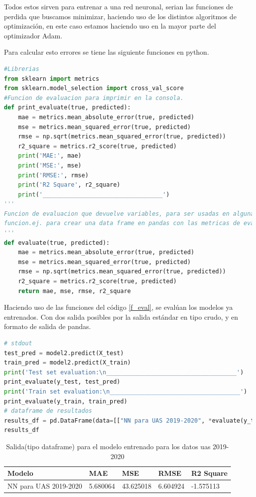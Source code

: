 Todos estos sirven para entrenar a una red neuronal, serian las funciones de
perdida que buscamos minimizar, haciendo uso de los distintos algoritmos de
optimización, en este caso estamos haciendo uso en la mayor parte del
optimizador Adam.

Para calcular esto errores se tiene las siguiente funciones en python. 
\begin{lstlisting}[language=Python, label=f_eval, caption= definicion de
funciones de evaluacion utilizando sklearn como herramienta base]
#Librerias
from sklearn import metrics
from sklearn.model_selection import cross_val_score
#Funcion de evaluacion para imprimir en la consola.
def print_evaluate(true, predicted):  
    mae = metrics.mean_absolute_error(true, predicted)
    mse = metrics.mean_squared_error(true, predicted)
    rmse = np.sqrt(metrics.mean_squared_error(true, predicted))
    r2_square = metrics.r2_score(true, predicted)
    print('MAE:', mae)
    print('MSE:', mse)
    print('RMSE:', rmse)
    print('R2 Square', r2_square)
    print('__________________________________')
'''
Funcion de evaluacion que devuelve variables, para ser usadas en alguna otra
funcion.ej. para crear una data frame en pandas con las metricas de evaluacion. 
'''
def evaluate(true, predicted):
    mae = metrics.mean_absolute_error(true, predicted)
    mse = metrics.mean_squared_error(true, predicted)
    rmse = np.sqrt(metrics.mean_squared_error(true, predicted))
    r2_square = metrics.r2_score(true, predicted)
    return mae, mse, rmse, r2_square
\end{lstlisting}

Haciendo uso de las funciones del código \ref{f_eval}, se evalúan los modelos
ya entrenados. Con dos  salida posibles por la salida estándar en tipo crudo, y
en formato de salida de pandas.

\begin{lstlisting}[language=Python, caption=Funciones  utilizadas en la
evaluación de los modelos]
# stdout
test_pred = model2.predict(X_test)
train_pred = model2.predict(X_train)
print('Test set evaluation:\n_____________________________________')
print_evaluate(y_test, test_pred)
print('Train set evaluation:\n_____________________________________')
print_evaluate(y_train, train_pred)
# dataframe de resultados
results_df = pd.DataFrame(data=[["NN para UAS 2019-2020", *evaluate(y_test, test_pred)]],columns=['Model', 'MAE', 'MSE', 'RMSE', 'R2 Square'])
results_df
\end{lstlisting}
\begin{table}[H]
    \centering
    \begin{tabular}{|p{5cm}|p{2cm}|p{2cm}|p{2cm}|p{2cm}|}\hline
        Modelo & MAE	& MSE	&RMSE	&R2 Square\\\hline
        NN para UAS 2019-2020 & 5.680064 & 43.625018 & 6.604924	& -1.575113\\
        \hline
    \end{tabular}
    \caption{Salida(tipo dataframe) para el modelo entrenado para los datos uas
    2019-2020}
    \label{model1}
\end{table}

